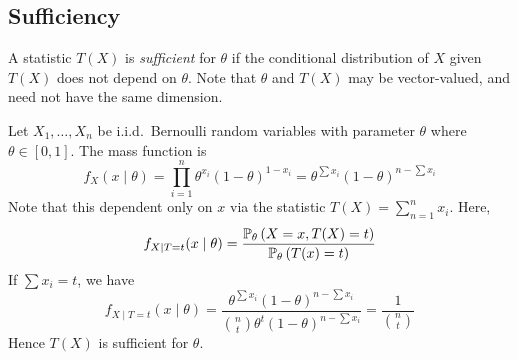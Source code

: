 \subsection{Sufficiency}
\begin{definition}
	A statistic \( T(X) \) is \textit{sufficient} for \( \theta \) if the conditional distribution of \( X \) given \( T(X) \) does not depend on \( \theta \).
	Note that \( \theta \) and \( T(X) \) may be vector-valued, and need not have the same dimension.
\end{definition}
\begin{example}
	Let \( X_1, \dots, X_n \) be i.i.d.\ Bernoulli random variables with parameter \( \theta \) where \( \theta \in [0,1] \).
	The mass function is
	\[ f_X(x \mid \theta) = \prod_{i=1}^n \theta^{x_i}(1-\theta)^{1-x_i} = \theta^{\sum x_i} (1-\theta)^{n - \sum x_i} \]
	Note that this dependent only on \( x \) via the statistic \( T(X) = \sum_{n=1}^n x_i \).
	Here,
	\[ f_{X \mid T = t}(x \mid \theta) = \frac{\mathbb{P}_{\theta}\left({X = x, T(X) = t}\right)}{\mathbb{P}_{\theta}\left({T(x) = t}\right)} \]
	If \( \sum x_i = t \), we have
	\[ f_{X \mid T = t}(x \mid \theta) = \frac{\theta^{\sum x_i} (1-\theta)^{n-\sum x_i}}{\binom{n}{t} \theta^t (1-\theta)^{n-\sum x_i}} = \frac{1}{\binom{n}{t}} \]
	Hence \( T(X) \) is sufficient for \( \theta \).
\end{example}

